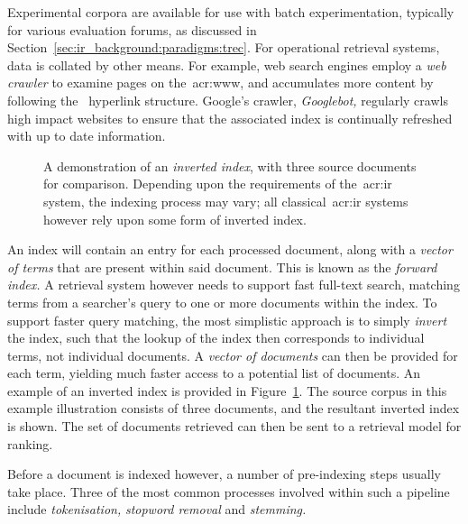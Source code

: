 Experimental corpora are available for use with batch experimentation, typically for various evaluation forums, as discussed in Section~\ref{sec:ir_background:paradigms:trec}. For operational retrieval systems, data is collated by other means. For example, web search engines employ a \emph{web crawler} to examine pages on the~\gls{acr:www}, and accumulates more content by following the~ hyperlink structure. Google's crawler, \emph{Googlebot,} regularly crawls high impact websites to ensure that the associated index is continually refreshed with up to date information.

\begin{figure}[t!]
    \centering
    \caption[Illustration of an \emph{inverted index}]{A demonstration of an \emph{inverted index}, with three source documents for comparison. Depending upon the requirements of the~\gls{acr:ir} system, the indexing process may vary; all classical~\gls{acr:ir} systems however rely upon some form of inverted index.}
    \label{fig:inverted}
\end{figure}

An index will contain an entry for each processed document, along with a \emph{vector of terms} that are present within said document. This is known as the \emph{forward index.} A retrieval system however needs to support fast full-text search, matching terms from a searcher's query to one or more documents within the index. To support faster query matching, the most simplistic approach is to simply \emph{invert} the index, such that the lookup of the index then corresponds to individual terms, not individual documents. A \emph{vector of documents} can then be provided for each term, yielding much faster access to a potential list of documents. An example of an inverted index is provided in Figure~\ref{fig:inverted}. The source corpus in this example illustration consists of three documents, and the resultant inverted index is shown. The set of documents retrieved can then be sent to a retrieval model for ranking.

Before a document is indexed however, a number of pre-indexing steps usually take place. Three of the most common processes involved within such a pipeline include \emph{tokenisation,} \emph{stopword removal} and \emph{stemming.}

